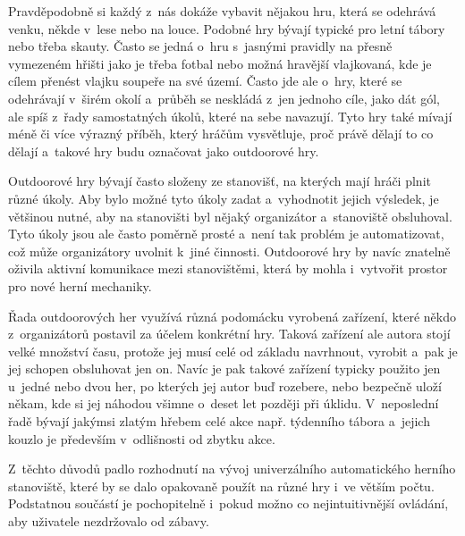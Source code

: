Pravděpodobně si každý z~nás dokáže vybavit nějakou hru, která se odehrává venku, někde v~lese nebo na louce.
Podobné hry bývají typické pro letní tábory nebo třeba skauty.
Často se jedná o~hru s~jasnými pravidly na přesně vymezeném hřišti jako je třeba fotbal nebo možná hravější vlajkovaná, kde je cílem přenést vlajku soupeře na své území. 
Často jde ale o~hry, které se odehrávají v~širém okolí a~průběh se neskládá z~jen jednoho cíle, jako dát gól, ale spíš z~řady samostatných úkolů, které na sebe navazují.
Tyto hry také mívají méně či více výrazný příběh, který hráčům vysvětluje, proč právě dělají to co dělají a~takové hry budu označovat jako outdoorové hry.

Outdoorové hry bývají často složeny ze stanovišť, na kterých mají hráči plnit různé úkoly.
Aby bylo možné tyto úkoly zadat a~vyhodnotit jejich výsledek, je většinou nutné, aby na stanovišti byl nějaký organizátor a~stanoviště obsluhoval.
Tyto úkoly jsou ale často poměrně prosté a~není tak problém je automatizovat, což může organizátory uvolnit k~jiné činnosti.
Outdoorové hry by navíc znatelně oživila aktivní komunikace mezi stanovištěmi, která by mohla i~vytvořit prostor pro nové herní mechaniky.

Řada outdoorových her využívá různá podomácku vyrobená zařízení, které někdo z~organizátorů postavil za účelem konkrétní hry.
Taková zařízení ale autora stojí velké množství času, protože jej musí celé od základu navrhnout, vyrobit a~pak je jej schopen obsluhovat jen on.
Navíc je pak takové zařízení typicky použito jen u~jedné nebo dvou her, po kterých jej autor buď rozebere, nebo bezpečně uloží někam, kde si jej náhodou všimne o~deset let později při úklidu.
V~neposlední řadě bývají jakýmsi zlatým hřebem celé akce např. týdenního tábora a~jejich kouzlo je především v~odlišnosti od zbytku akce.

Z~těchto důvodů padlo rozhodnutí na vývoj univerzálního automatického herního stanoviště, které by se dalo opakovaně použít na různé hry i~ve větším počtu.
Podstatnou součástí je pochopitelně i~pokud možno co nejintuitivnější ovládání, aby uživatele nezdržovalo od zábavy.




